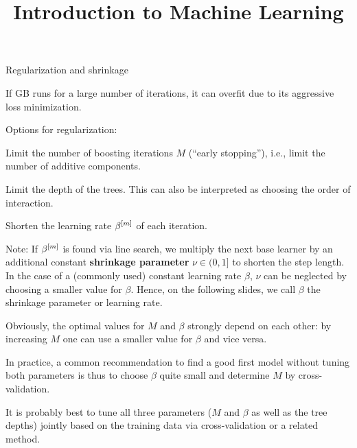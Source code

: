  





\newcommand{\titlefigure}{figure/gbm_sine_title}
\newcommand{\learninggoals}{
  \item Learn about three main regularization options: number of iterations, 
  tree depth and shrinkage
  \item Understand how regularization influences model fit
}

\title{Introduction to Machine Learning}
\date{}






\begin{vbframe}{Regularization and shrinkage}

If GB runs for a large number of iterations, it can overfit due to its aggressive loss
minimization.

\begin{blocki}{Options for regularization:}
\item Limit the number of boosting iterations $M$ (\enquote{early stopping}), i.e., limit the number of additive components.
\item Limit the depth of the trees. This can also be interpreted as choosing the order of interaction.
\item Shorten the learning rate $\beta^{[m]}$ of each iteration.
\end{blocki}


Note: If $\beta^{[m]}$ is found via line search, we multiply the next base learner by an additional constant \textbf{shrinkage parameter} $\nu \in (0,1]$ to shorten the step length.
In the case of a (commonly used) constant learning rate $\beta$, $\nu$ can be neglected by choosing a smaller value for $\beta$.
Hence, on the following slides, we call $\beta$ the shrinkage parameter or learning rate.


\framebreak

Obviously, the optimal values for $M$ and $\beta$ strongly depend on each other:
by increasing $M$ one can use a smaller value for $\beta$ and vice versa.

\lz

In practice, a common recommendation to find a good first model without tuning both parameters is thus to choose $\beta$ quite small and determine $M$ by cross-validation. 

\lz

It is probably best to tune all three parameters ($M$ and $\beta$ as well as 
the tree depths) jointly based on the training data
via cross-validation or a related method.

\end{vbframe}


